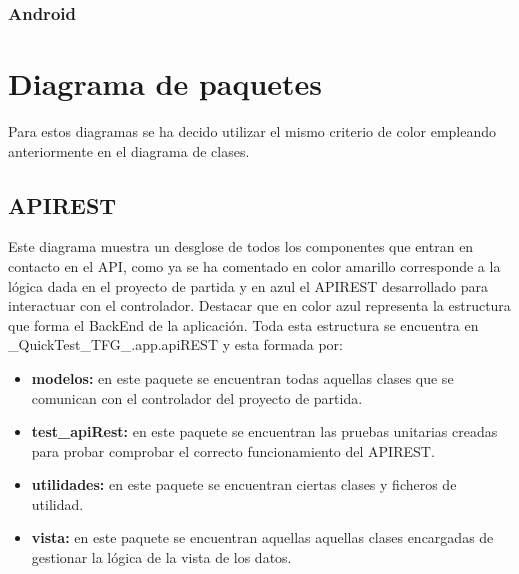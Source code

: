 
\subsubsection{Android}

\begin{landscape}
\end{landscape}



\section{Diagrama de paquetes}

Para estos diagramas se ha decido utilizar el mismo criterio de color empleando anteriormente en el diagrama de clases.

\subsection{APIREST}

Este diagrama muestra un desglose de todos los componentes que entran en contacto en el API, como ya se ha comentado en color amarillo corresponde a la lógica dada en el proyecto de partida y en azul el APIREST desarrollado para interactuar con el controlador. Destacar que en color azul representa la estructura que forma el BackEnd de la aplicación. Toda esta estructura se encuentra en  
\_QuickTest\_TFG\_.app.apiREST y esta formada por:

\begin{itemize}

	\item \textbf{modelos:} en este paquete se encuentran todas aquellas clases que se comunican con el controlador del proyecto de partida.
	\item \textbf{test\_apiRest:} en este paquete se encuentran las pruebas unitarias creadas para probar comprobar el correcto funcionamiento del APIREST.
	\item \textbf{utilidades:} en este paquete se encuentran ciertas clases y ficheros de utilidad.
	\item \textbf{vista:} en este paquete se encuentran aquellas aquellas clases encargadas de gestionar la lógica de la vista de los datos.

\end{itemize}

